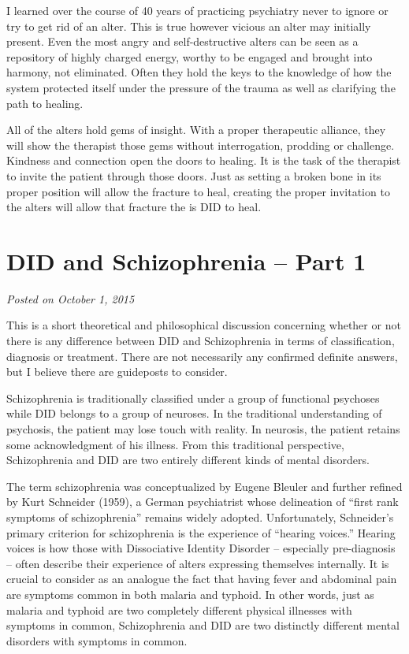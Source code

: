 \documentclass[]{book}
\begin{document}
I learned over the course of 40 years of practicing psychiatry never to ignore or try to get rid of an alter. This is true however vicious an alter may initially present. Even the most angry and self-destructive alters can be seen as a repository of highly charged energy, worthy to be engaged and brought into harmony, not eliminated. Often they hold the keys to the knowledge of how the system protected itself under the pressure of the trauma as well as clarifying the path to healing.

All of the alters hold gems of insight. With a proper therapeutic alliance, they will show the therapist those gems without interrogation, prodding or challenge. Kindness and connection open the doors to healing. It is the task of the therapist to invite the patient through those doors. Just as setting a broken bone in its proper position will allow the fracture to heal, creating the proper invitation to the alters will allow that fracture the is DID to heal.

\hypertarget{did-and-schizophrenia-part-1}{%
\section{DID and Schizophrenia -- Part 1}\label{did-and-schizophrenia-part-1}}

\emph{Posted on October 1, 2015}

This is a short theoretical and philosophical discussion concerning whether or not there is any difference between DID and Schizophrenia in terms of classification, diagnosis or treatment. There are not necessarily any confirmed definite answers, but I believe there are guideposts to consider.

Schizophrenia is traditionally classified under a group of functional psychoses while DID belongs to a group of neuroses. In the traditional understanding of psychosis, the patient may lose touch with reality. In neurosis, the patient retains some acknowledgment of his illness. From this traditional perspective, Schizophrenia and DID are two entirely different kinds of mental disorders.

The term schizophrenia was conceptualized by Eugene Bleuler and further refined by Kurt Schneider (1959), a German psychiatrist whose delineation of ``first rank symptoms of schizophrenia'' remains widely adopted. Unfortunately, Schneider's primary criterion for schizophrenia is the experience of ``hearing voices.'' Hearing voices is how those with Dissociative Identity Disorder -- especially pre-diagnosis -- often describe their experience of alters expressing themselves internally. It is crucial to consider as an analogue the fact that having fever and abdominal pain are symptoms common in both malaria and typhoid. In other words, just as malaria and typhoid are two completely different physical illnesses with symptoms in common, Schizophrenia and DID are two distinctly different mental disorders with symptoms in common.
\end{document}
